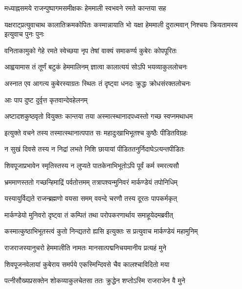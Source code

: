 \twolineshloka
{मध्याह्नसमये राजन्पुष्पागमसमीक्षकः}
{हेममाली स्वभवने रमते कान्तया सह}%

\threelineshloka
{यक्षराट्प्रत्युवाचाथ कालातिक्रमकोपितः}
{कस्मान्नायाति भो यक्षा हेममाली दुरात्मवान्}
{निश्चयः क्रियतामस्य इत्युवाच पुनः पुनः}%


\twolineshloka
{वनिताकामुको गेहे रमते स्वेच्छया नृप}
{तेषां वाक्यं समाकर्ण्य कुबेरः कोपपूरितः}%

\twolineshloka
{आह्वयामास तं तूर्णं बटुकं हेममालिनम्}
{ज्ञात्वा कालात्ययं सोऽपि भयव्याकुललोचनः}%

\twolineshloka
{अस्नात एव आगत्य कुबेरस्याग्रतः स्थितः}
{तं दृष्ट्वा धनदः क्रुद्धः क्रोधसंरक्तलोचनः}%

\onelineshloka
{आः पाप दुष्ट दुर्वृत्त कृतवान्देवहेलनम्}%

\twolineshloka
{अष्टादशकुष्ठवृतो वियुक्तः कान्तया तया}
{अस्मात्स्थानादपध्वस्तो गच्छ स्वप्नमथाधम}%

\twolineshloka
{इत्युक्ते वचने तस्य तस्मात्स्थानात्पपात सः}
{महादुःखाभिभूतश्च कुष्ठैः पीडितविग्रहः}%

\twolineshloka
{न सुखं दिवसे तस्य न निद्रां लभते निशि}
{छायायां पीडिततनुर्निदाघेऽत्यन्तपीडितः}%

\twolineshloka
{शिवपूजाप्रभावेन स्मृतिस्तस्य न लुप्यते}
{पातकेनाभिभूतोऽपि पूर्वं कर्म स्मरत्यसौ}%

\twolineshloka
{भ्रममाणस्ततो गच्छन्हिमाद्रिं पर्वतोत्तमम्}
{तत्रापश्यन्मुनिवरं मार्कण्डेयं तपोनिधिम्}%

\twolineshloka
{यस्यायुर्विद्यते राजन्ब्रह्मणो वयसा समम्}
{ववन्दे चरणौ तस्य दूरतः पापकर्मकृत्}%

\twolineshloka
{मार्कण्डेयो मुनिवरो दृष्ट्वा तं कम्पितं तथा}
{परोपकरणार्थाय समाहूयेदमब्रवीत्}%

\twolineshloka
{कस्मात्कुष्ठाभिभूतस्त्वं कुतो निन्द्यतरो ह्यसि}
{इत्युक्तः स प्रत्युवाच मार्कण्डेयं महामुनिम्}%


\twolineshloka
{राजराजस्यानुचरो हेममालीति नामतः}
{मानसात्पद्मनिचयमानीय प्रत्यहं मुने}%

\twolineshloka
{शिवपूजनवेलायां कुबेराय समर्पये}
{एकस्मिन्दिवसे चैव कालश्चाविदितो मया}%

\twolineshloka
{पत्नीसौख्यप्रसक्तेन शोकव्याकुलचेतसा}
{ततः क्रुद्धेन शप्तोऽस्मि राजराजेन वै मुने}%

